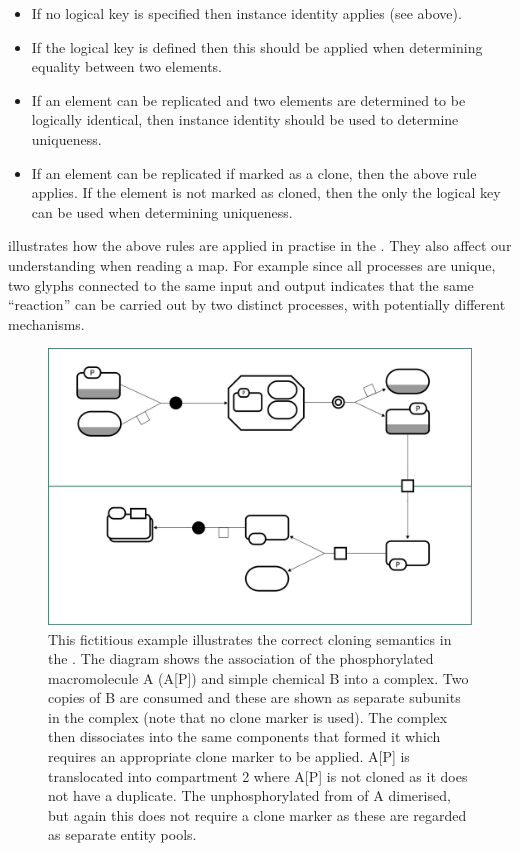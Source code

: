\begin{itemize}
\item If no logical key is specified then instance identity applies
  (see above).
\item If the logical key is defined then this should be applied when
  determining equality between two elements.
\item If an element can be replicated and two elements are determined
  to be logically identical, then instance identity should be used to
  determine uniqueness.
\item If an element can be replicated if marked as a clone, then the
  above rule applies. If the element is not marked as cloned, then the
  only the logical key can be used when determining uniqueness.
\end{itemize}

 illustrates how the above rules are applied in
practise in the \PDm. They also affect our understanding when reading
a map. For example since all processes are unique, two 
glyphs connected to the same input and output indicates that the same
``reaction'' can be carried out by two distinct processes, with
potentially different mechanisms.

\begin{figure}[htb]
  \centering
  \includegraphics[width=\textwidth]{images/cloningrules-eg}
  \caption{This fictitious example illustrates the correct cloning semantics in
    the \PDl. The diagram shows the association of the phosphorylated
    macromolecule A (A[P]) and simple chemical B into a complex. Two
    copies of B are consumed and these are shown as separate subunits
    in the complex (note that no clone marker is used). The complex
    then dissociates into the same components that formed it which
    requires an appropriate clone marker to be applied. A[P] is
    translocated into compartment 2 where A[P] is not cloned as it
    does not have a duplicate. The unphosphorylated from of A
    dimerised, but again this does not require a clone marker as these
    are regarded as separate entity pools.}
  \label{fig:cloningrules-eg}
\end{figure}

